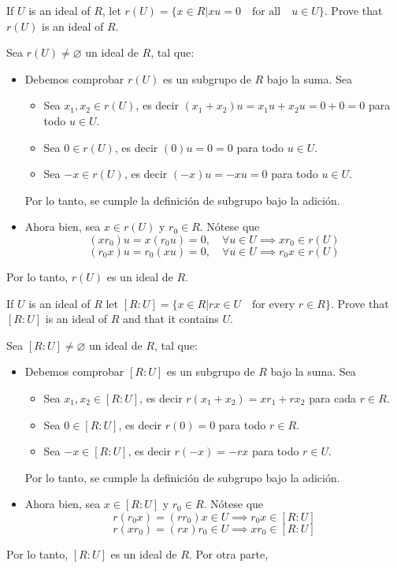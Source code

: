 \begin{problema}[Problema 9]
    If $U$ is an ideal of $R$, let $r(U) = \{x \in R | xu = 0 \quad\text{for all}\quad u\in  U\}$. Prove that $r(U)$ is an ideal of $R$.
    \begin{dem}
        Sea $r(U)\neq \varnothing$ un ideal de $R$, tal que: 
        \begin{itemize}
            \item Debemos comprobar $r(U)$ es un subgrupo de $R$ bajo la suma. Sea 
            \begin{itemize}
                \item Sea $x_1,x_2\in r(U)$, es decir $(x_1+x_2)u=x_1u+x_2u=0+0=0$ para todo $u\in U$.
                \item Sea $0\in r(U)$, es decir $(0)u=0=0$ para todo $u\in U$.
                \item Sea $-x\in r(U)$, es decir $(-x)u=-xu=0$ para todo $u\in U$. 
            \end{itemize}
            Por lo tanto, se cumple la definición de subgrupo bajo la adición.
            \item Ahora bien, sea $x\in r(U)$ y $r_0\in R$. Nótese que 
            $$(xr_0)u=x(r_0u)=0,\quad \forall u\in U \implies xr_0\in r(U) $$
            $$(r_0x)u=r_0(xu)=0,\quad \forall u\in U\implies r_0x\in r(U)$$
        \end{itemize}
        Por lo tanto, $r(U)$ es un ideal de $R$. 
    \end{dem}
\end{problema}
\begin{problema}[Problema 10]
    If $U$ is an ideal of $R$ let $[R:U]= \{x\in R  |rx\in U \quad \text{for every }r\in R\}$. Prove that $[R: U]$ is an ideal of $R$ and that it contains $U$.
    \begin{dem}
        Sea $[R:U]\neq \varnothing$ un ideal de $R$, tal que: 
        \begin{itemize}
            \item Debemos comprobar $[R:U]$ es un subgrupo de $R$ bajo la suma. Sea 
            \begin{itemize}
                \item Sea $x_1,x_2\in [R:U]$, es decir $r(x_1+x_2)=xr_1+rx_2$ para cada $r\in R$.
                \item Sea $0\in [R:U]$, es decir $r(0)=0$ para todo $r\in R$.
                \item Sea $-x\in [R:U]$, es decir $r(-x)=-rx$ para todo $r\in U$.
            \end{itemize}
            Por lo tanto, se cumple la definición de subgrupo bajo la adición.
            \item Ahora bien, sea $x\in [R:U]$ y $r_0\in R$. Nótese que 
            $$r(r_0 x)=(rr_0)x\in U\implies r_0x\in [R:U]$$
            $$r(xr_0)=(rx)r_0\in U\implies xr_0\in [R:U]$$
        \end{itemize}
        Por lo tanto, $[R:U]$ es un ideal de $R$. Por otra parte, 
    \end{dem}
\end{problema}
